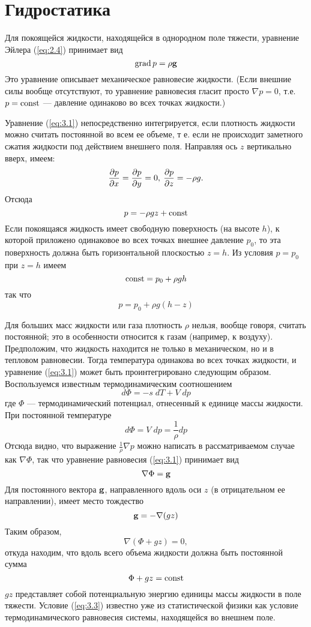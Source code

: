 \section{Гидростатика}
\label{sec:p3}

Для покоящейся жидкости, находящейся в однородном поле тяжести, уравнение Эйлера
(\ref{eq:2.4}) принимает вид
\begin{equation}
   \label{eq:3.1}
   \mathop{\mathrm{grad}}\nolimits p = \rho \mathbf{g}
\end{equation}
Это уравнение описывает механическое равновесие жидкости. (Если внешние силы
вообще отсутствуют, то уравнение равновесия гласит просто $\nabla p = 0$, т.е.
$p = \mathop{\mathrm{const}}\nolimits$ — давление одинаково во всех точках жидкости.)

Уравнение (\ref{eq:3.1}) непосредственно интегрируется, если плотность жидкости можно
считать постоянной во всем ее объеме, т е. если не происходит заметного сжатия
жидкости под действием внешнего поля. Направляя ось $z$ вертикально вверх,
имеем:
\[
   \frac{\partial{p}}{\partial{x}}=\frac{\partial{p}}{\partial{y}}=0,\: \frac{\partial{p}}{\partial{z}} = -\rho g.
\]
Отсюда
\[
   p = -\rho gz + \mathop{\mathrm{const}}\nolimits
\]
Если покоящаяся жидкость имеет свободную поверхность (на высоте $h$), к которой
приложено одинаковое во всех точках внешнее давление $p_0$, то эта поверхность
должна быть горизонтальной плоскостью $z=h$. Из условия $p=p_0$ при $z=h$ имеем
\[
   \mathop{\mathrm{const}}\nolimits = p_0 + \rho gh
\]
так что
\begin{equation}
   \label{eq:3.2}
   p = p_0 + \rho g(h-z)
\end{equation}

Для больших масс жидкости или газа плотность $\rho$ нельзя, вообще говоря,
считать постоянной; это в особенности относится к газам (например, к воздуху).
Предположим, что жидкость находится не только в механическом, но и в тепловом
равновесии. Тогда температура одинакова во всех точках жидкости, и уравнение
(\ref{eq:3.1}) может быть проинтегрировано следующим образом. Воспользуемся известным
термодинамическим соотношением
\[
   d\Phi = -s\;dT + V\; dp
\]
где $\Phi$ — термодинамический потенциал, отнесенный к единице массы жидкости.
При постоянной температуре
\[
   d\Phi = V\; dp = \frac1{\rho}dp
\]
Отсюда видно, что выражение $\frac1{\rho}\nabla p$   можно написать в
рассматриваемом случае как $\nabla \Phi$, так что уравнение равновесия (\ref{eq:3.1})
принимает вид
\[
   \nabla \Phi = \mathbf{g}
\]
Для постоянного вектора $\mathbf{g}$, направленного вдоль оси $z$ (в отрицательном
ее направлении), имеет место тождество
\[
   \mathbf{g} = - \nabla (gz)
\]
Таким образом,
\[
   \nabla(\Phi + gz) = 0,
\]
откуда находим, что вдоль всего объема жидкости должна быть постоянной сумма
\begin{equation}
   \label{eq:3.3}
   \Phi + gz = \mathop{\mathrm{const}}\nolimits
\end{equation}
$gz$ представляет собой потенциальную энергию единицы массы жидкости в поле
тяжести. Условие (\ref{eq:3.3}) известно уже из статистической физики как условие
термодинамического равновесия системы, находящейся во внешнем поле.

